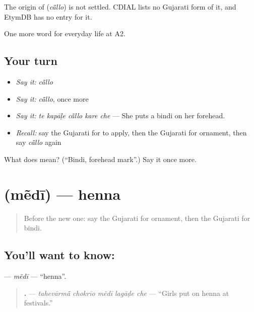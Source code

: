 \begin{cousinweb}
The origin of \textbf{} (\emph{cā̃llo}) is not settled. CDIAL lists no Gujarati form of it, and EtymDB has no entry for it.
\end{cousinweb}

\begin{grammarlens}[title={What you've built}]
One more word for everyday life at A2.
\end{grammarlens}

\subsection*{Your turn}
\begin{itemize}
\raggedright
  \item \emph{Say it:} \emph{cā̃llo}
  \item \emph{Say it:} \emph{cā̃llo}, once more
  \item \emph{Say it:} \emph{te kapāḷe cā̃llo kare che} — She puts a bindi on her forehead.
  \item \emph{Recall:} say the Gujarati for to apply, then the Gujarati for ornament, then say \emph{cā̃llo} again
\end{itemize}

\begin{tcolorbox}[breakable,colback=teal!4,colframe=teal!35!black,title={Before you move on}]
What does  mean? (\textquotedblleft{}Bindi, forehead mark\textquotedblright{}.) Say it once more.
\end{tcolorbox}
\section[\texorpdfstring{\gu{મેંદી} (mẽdī)}{મેંદી (mẽdī)}]{ (mẽdī) — henna}

\label{lesson:GU-C156-medi}



\begin{quote}
Before the new one: say the Gujarati for ornament, then the Gujarati for bindi.
\end{quote}

\subsection*{You'll want to know: }
\textbf{} — \emph{mẽdī} — \textquotedblleft{}henna\textquotedblright{}.

\begin{quote}
\textbf{    .} — \emph{tahevārmā̃ chokrīo mẽdī lagāḍe che} — \textquotedblleft{}Girls put on henna at festivals.\textquotedblright{}
\end{quote}

